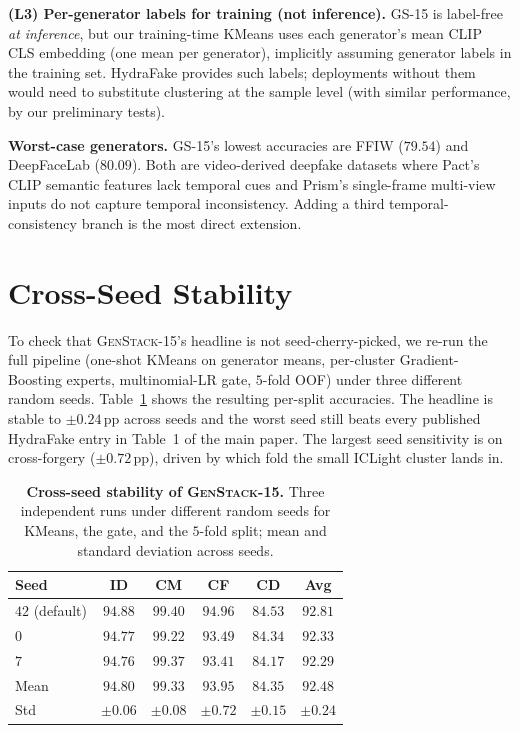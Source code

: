 \documentclass[10pt,twocolumn,letterpaper]{article}
\begin{document}
\noindent\textbf{(L3) Per-generator labels for training (not inference).} \textsc{GS-15} is label-free \emph{at inference}, but our training-time KMeans uses each generator's mean CLIP CLS embedding (one mean per generator), implicitly assuming generator labels in the training set. HydraFake provides such labels; deployments without them would need to substitute clustering at the sample level (with similar performance, by our preliminary tests).

\noindent\textbf{Worst-case generators.} \textsc{GS-15}'s lowest accuracies are FFIW ($79.54$) and DeepFaceLab ($80.09$). Both are video-derived deepfake datasets where Pact's CLIP semantic features lack temporal cues and Prism's single-frame multi-view inputs do not capture temporal inconsistency. Adding a third temporal-consistency branch is the most direct extension.

\section{Cross-Seed Stability}
\label{sec:seed_stability}

To check that \textsc{GenStack-15}'s headline is not seed-cherry-picked, we re-run the full pipeline (one-shot KMeans on generator means, per-cluster Gradient-Boosting experts, multinomial-LR gate, $5$-fold OOF) under three different random seeds. Table~\ref{tab:seed_stability} shows the resulting per-split accuracies. The headline is stable to $\pm0.24$\,pp across seeds and the worst seed still beats every published HydraFake entry in Table~1 of the main paper. The largest seed sensitivity is on cross-forgery ($\pm 0.72$\,pp), driven by which fold the small ICLight cluster lands in.

\begin{table}[h]
\centering
\footnotesize
\setlength{\tabcolsep}{4pt}
\caption{\textbf{Cross-seed stability of \textsc{GenStack-15}.} Three independent runs under different random seeds for KMeans, the gate, and the $5$-fold split; mean and standard deviation across seeds.}
\label{tab:seed_stability}
\begin{tabular}{l c c c c c}
\toprule
Seed & ID & CM & CF & CD & Avg \\
\midrule
$42$ (default) & $94.88$ & $99.40$ & $94.96$ & $84.53$ & $\mathbf{92.81}$ \\
$0$            & $94.77$ & $99.22$ & $93.49$ & $84.34$ & $92.33$ \\
$7$            & $94.76$ & $99.37$ & $93.41$ & $84.17$ & $92.29$ \\
\midrule
Mean           & $94.80$ & $99.33$ & $93.95$ & $84.35$ & $92.48$ \\
Std            & $\pm 0.06$ & $\pm 0.08$ & $\pm 0.72$ & $\pm 0.15$ & $\pm 0.24$ \\
\bottomrule
\end{tabular}
\end{table}
\end{document}
